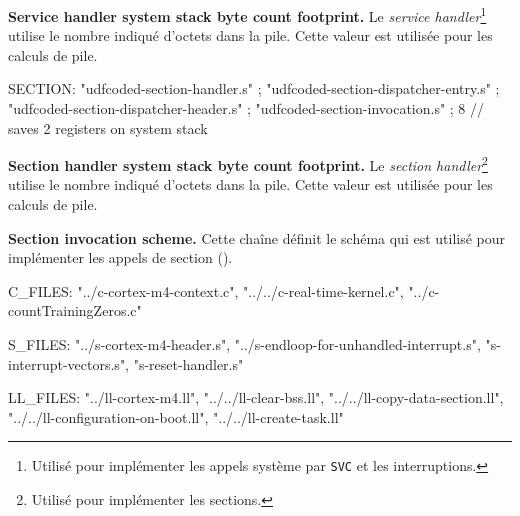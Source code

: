 {\bf Service handler system stack byte count footprint.} Le \emph{service handler}\footnote{Utilisé pour implémenter les appels système par \texttt{SVC} et les interruptions.} utilise le nombre indiqué d'octets dans la pile. Cette valeur est utilisée pour les calculs de pile.









\begin{PLM}
SECTION:
  "udfcoded-section-handler.s" ;
  "udfcoded-section-dispatcher-entry.s" ;
  "udfcoded-section-dispatcher-header.s" ;
  "udfcoded-section-invocation.s" ;
  8 // saves 2 registers on system stack
\end{PLM}

{\bf Section handler system stack byte count footprint.} Le \emph{section handler}\footnote{Utilisé pour implémenter les sections.} utilise le nombre indiqué d'octets dans la pile. Cette valeur est utilisée pour les calculs de pile.

{\bf Section invocation scheme.} Cette chaîne définit le schéma qui est utilisé pour implémenter les appels de section ().









\begin{PLM}
C_FILES:
  "../c-cortex-m4-context.c",
  "../../c-real-time-kernel.c",
  "../c-countTrainingZeros.c"
\end{PLM}









\begin{PLM}
S_FILES:
  "../s-cortex-m4-header.s",
  "../s-endloop-for-unhandled-interrupt.s",
  "s-interrupt-vectors.s",
  "s-reset-handler.s"
\end{PLM}









\begin{PLM}
LL_FILES:
  "../ll-cortex-m4.ll",
  "../../ll-clear-bss.ll",
  "../../ll-copy-data-section.ll",
  "../../ll-configuration-on-boot.ll",
  "../../ll-create-task.ll"
\end{PLM}








